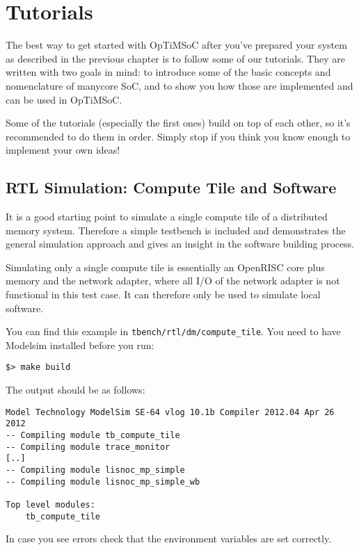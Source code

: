 \chapter{Tutorials}
\label{chap:tutorials}

The best way to get started with OpTiMSoC after you've prepared your
system as described in the previous chapter is to follow some of our
tutorials. They are written with two goals in mind: to introduce some
of the basic concepts and nomenclature of manycore SoC, and to show
you how those are implemented and can be used in OpTiMSoC.

Some of the tutorials (especially the first ones) build on top of each
other, so it's recommended to do them in order. Simply stop if you
think you know enough to implement your own ideas!

\section{RTL Simulation: Compute Tile and Software}

It is a good starting point to simulate a single compute tile of a
distributed memory system. Therefore a simple testbench is included
and demonstrates the general simulation approach and gives an insight
in the software building process.

Simulating only a single compute tile is essentially an OpenRISC core
plus memory and the network adapter, where all I/O of the network
adapter is not functional in this test case. It can therefore only be
used to simulate local software.

You can find this example in \verb|tbench/rtl/dm/compute_tile|. You
need to have Modelsim installed before you run:

\begin{lstlisting}
$> make build
\end{lstlisting}

The output should be as follows:

\begin{lstlisting}
Model Technology ModelSim SE-64 vlog 10.1b Compiler 2012.04 Apr 26 2012
-- Compiling module tb_compute_tile
-- Compiling module trace_monitor
[..]
-- Compiling module lisnoc_mp_simple
-- Compiling module lisnoc_mp_simple_wb

Top level modules:
	tb_compute_tile
\end{lstlisting}

In case you see errors check that the environment variables are set
correctly.

